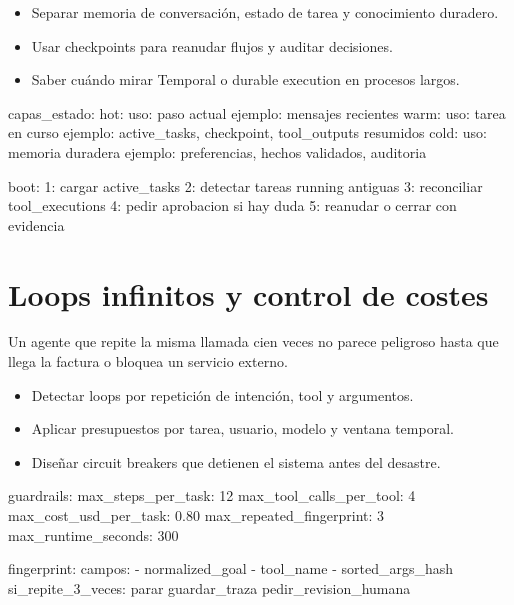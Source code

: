 \documentclass[11pt,a4paper]{book}
\begin{document}
\begin{itemize}\item Separar memoria de conversación, estado de tarea y conocimiento duradero.\end{itemize}
\begin{itemize}\item Usar checkpoints para reanudar flujos y auditar decisiones.\end{itemize}
\begin{itemize}\item Saber cuándo mirar Temporal o durable execution en procesos largos.\end{itemize}
\begin{codebox}
capas_estado:
  hot:
    uso: paso actual
    ejemplo: mensajes recientes
  warm:
    uso: tarea en curso
    ejemplo: active_tasks, checkpoint, tool_outputs resumidos
  cold:
    uso: memoria duradera
    ejemplo: preferencias, hechos validados, auditoria

boot:
  1: cargar active_tasks
  2: detectar tareas running antiguas
  3: reconciliar tool_executions
  4: pedir aprobacion si hay duda
  5: reanudar o cerrar con evidencia
\end{codebox}
\chapter{Loops infinitos y control de costes}
Un agente que repite la misma llamada cien veces no parece peligroso hasta que llega la factura o bloquea un servicio externo.

\begin{itemize}\item Detectar loops por repetición de intención, tool y argumentos.\end{itemize}
\begin{itemize}\item Aplicar presupuestos por tarea, usuario, modelo y ventana temporal.\end{itemize}
\begin{itemize}\item Diseñar circuit breakers que detienen el sistema antes del desastre.\end{itemize}
\begin{codebox}
guardrails:
  max_steps_per_task: 12
  max_tool_calls_per_tool: 4
  max_cost_usd_per_task: 0.80
  max_repeated_fingerprint: 3
  max_runtime_seconds: 300

fingerprint:
  campos:
    - normalized_goal
    - tool_name
    - sorted_args_hash
  si_repite_3_veces:
    parar
    guardar_traza
    pedir_revision_humana
\end{codebox}
\end{document}
